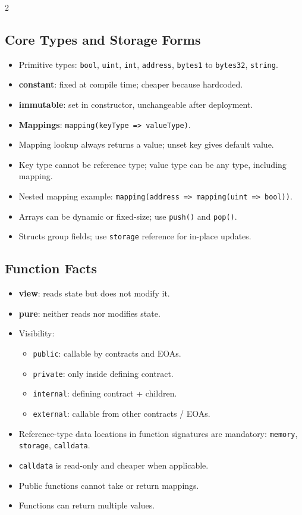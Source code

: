 \documentclass[10pt,a4paper]{article}
\newcommand{\term}[1]{\textbf{#1}}
\newcommand{\code}[1]{\texttt{#1}}
\begin{document}
\begin{multicols*}{2}
\subsection*{Core Types and Storage Forms}
\begin{itemize}
\item Primitive types: \code{bool}, \code{uint}, \code{int}, \code{address}, \code{bytes1} to \code{bytes32}, \code{string}.
\item \term{constant}: fixed at compile time; cheaper because hardcoded.
\item \term{immutable}: set in constructor, unchangeable after deployment.
\item \term{Mappings}: \code{mapping(keyType => valueType)}.
\item Mapping lookup always returns a value; unset key gives default value.
\item Key type cannot be reference type; value type can be any type, including mapping.
\item Nested mapping example:
\code{mapping(address => mapping(uint => bool))}.
\item Arrays can be dynamic or fixed-size; use \code{push()} and \code{pop()}.
\item Structs group fields; use \code{storage} reference for in-place updates.
\end{itemize}

\subsection*{Function Facts}
\begin{itemize}
\item \term{view}: reads state but does not modify it.
\item \term{pure}: neither reads nor modifies state.
\item Visibility:
\begin{itemize}
\item \code{public}: callable by contracts and EOAs.
\item \code{private}: only inside defining contract.
\item \code{internal}: defining contract + children.
\item \code{external}: callable from other contracts / EOAs.
\end{itemize}
\item Reference-type data locations in function signatures are mandatory:
\code{memory}, \code{storage}, \code{calldata}.
\item \code{calldata} is read-only and cheaper when applicable.
\item Public functions cannot take or return mappings.
\item Functions can return multiple values.
\end{itemize}


\end{multicols*}
\end{document}
